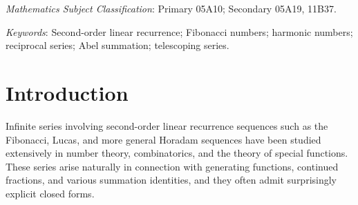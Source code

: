 \documentclass[12pt,reqno]{article}
\begin{document}
\begin{abstract}
We develop a unified method for transforming and evaluating infinite series involving products of terms of second-order linear recurrences in the denominator. The approach is based on a discrete Abel-type summation formula (summation by parts), which converts reciprocal series with three or more factors into expressions exhibiting a partial telescoping structure. As a consequence, we obtain general transformation formulas for series of the form
$\sum\limits_{k=1}^{\infty} \frac{(\pm 1)^k}{w_{rk+l}\, w_{mk+s}\, w_{m(k+1)+s}}$,
together with extensions to products of four or more terms. These formulas provide a systematic framework that unifies and extends many known identities for Fibonacci and Lucas numbers.

In addition, the method leads to explicit evaluations and identities involving several classical combinatorial sequences, including Catalan numbers, harmonic numbers, and Stirling numbers of both kinds.

A key feature of the approach is that it naturally distinguishes between even and odd values of the parameter $m$, leading to structurally different representations. The results show that summation by parts is an effective and flexible tool for reducing multi-factor reciprocal sums to simpler forms.
\end{abstract}
 {\it Mathematics Subject Classification}: Primary 05A10; Secondary 05A19, 11B37.

\medskip\noindent \emph{Keywords}: Second-order linear recurrence; Fibonacci numbers;  harmonic numbers;  reciprocal series; Abel summation;  telescoping series. 



\section{Introduction}


Infinite series involving second-order linear recurrence sequences such as the Fibonacci, Lucas, and more general Horadam sequences have been studied extensively in number theory, combinatorics, and the theory of special functions. These series arise naturally in 
connection with generating functions, continued fractions, and various summation identities, and they often admit surprisingly explicit closed forms.
\end{document}
